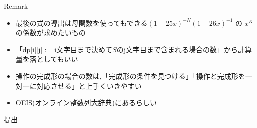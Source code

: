\documentclass[dvipdfmx,12pt]{beamer}%
\begin{document}
\begin{frame}
\begin{alertblock}{Remark}
	\begin{itemize}
		\item 最後の式の導出は母関数を使ってもできる$ (1-25x)^{-N}(1-26x)^{-1} $ の $ x^K $ の係数が求めたいもの
		\item 「dp[i][j] := i文字目まで決めて$S$のj文字目まで含まれる場合の数」から計算量を落としてもいい
		\item 操作の完成形の場合の数は,「完成形の条件を見つける」「操作と完成形を一対一に対応させる」と上手くいきやすい
		\item OEIS(オンライン整数列大辞典)にあるらしい
	\end{itemize}
\end{alertblock}

\href{https://atcoder.jp/contests/abc171/submissions/14675270}{提出}

\end{frame}

%
%
\end{document}
